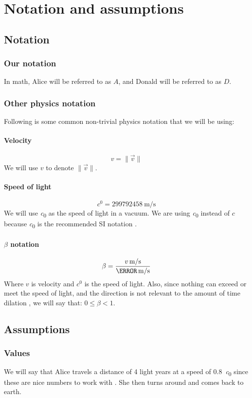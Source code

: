 	\section{Notation and assumptions}
		\subsection{Notation}\label{subsec:notation}
			\subsubsection{Our notation}
				In math, Alice will be referred to as $A$, and Donald will be referred to as $D$.
			\subsubsection{Other physics notation}
				Following is some common non-trivial physics notation that we will be using:
				\paragraph{Velocity}
					\[v = \|\vec{v}\|\]
					We will use $v$ to denote $\|\vec{v}\|$.
				\paragraph{Speed of light}
					\[\si{\clight} = \SI{299792458}{\metre/\second}\]
					We will use \si{\clight} as the speed of light in a vacuum. We are using \si{\clight} instead of $c$ because \si{\clight} is the recommended SI notation \autocite{siunits}.
				\paragraph{$\beta$ notation}
					\[\beta = \frac{\varSI{v}{\metre/\second}}{\varSI{\clight}{\metre/\second}}\]
					Where $v$ is velocity and $\si{\clight}$ is the speed of light. Also, since nothing can exceed or meet the speed of light, and the direction is not relevant to the amount of time dilation \autocite{textbook,einstein1916}, we will say that: $0 \leq \beta < 1$.
		\subsection{Assumptions}\label{subsec:twinAssumptions}
			\subsubsection{Values}
				We will say that Alice travels a distance of 4 light years at a speed of \SI{0.8}{\clight} since these are nice numbers to work with \autocite[\pno~35]{kogut2012introduction}.
				She then turns around and comes back to earth.
